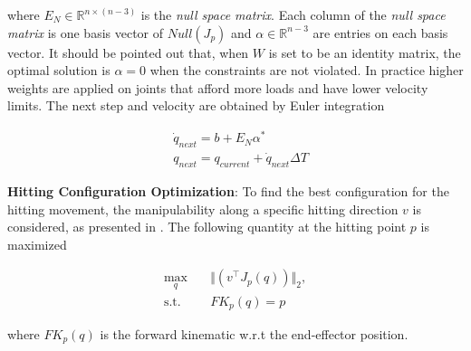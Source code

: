 where $E_N \in \mathbb{R}^{n\times \left(n - 3\right)}$ is the \textit{null space matrix}. Each column of the \textit{null space matrix} is one basis vector of
$Null(J_p)$ and $\alpha \in \mathbb{R}^{n-3}$ are entries on each basis vector. It should be pointed out that, when $W$ is set to be an identity matrix, the optimal solution
is $\alpha = 0$ when the constraints are not violated. In practice higher weights are applied on joints that afford more loads and have lower velocity limits.
The next step and velocity are obtained by Euler integration

\begin{equation*}
    \begin{aligned}
        &\dot{q}_{next} = b + E_N \alpha^* \\
        &q_{next} = q_{current} + \dot{q}_{next} \Delta T
    \end{aligned}
\end{equation*}

\textbf{Hitting Configuration Optimization}:
To find the best configuration for the hitting movement, the manipulability along a specific hitting direction $v$ is considered, as presented in \cite{manipulability}.
The following quantity at the hitting point $p$ is maximized

\begin{equation*}
    \begin{aligned}
        \max_q \quad& \Vert \left(v^\intercal J_p(q) \right) \Vert_2, \\
        \text{s.t.} \quad& FK_p(q) = p
    \end{aligned}
\end{equation*}

where $FK_p(q)$ is the forward kinematic w.r.t the end-effector position.


